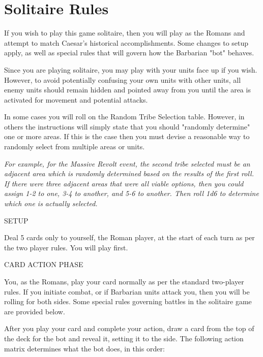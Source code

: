 \section{Solitaire Rules}

If you wish to play this game solitaire, then you will play as the Romans and attempt to match Caesar's historical accomplishments. Some changes to setup apply, as well as special rules that will govern how the Barbarian "bot" behaves.

Since you are playing solitaire, you may play with your units face up if you wish. However, to avoid potentially confusing your own units with other units, all enemy units should remain hidden and pointed away from you until the area is activated for movement and potential attacks.

In some cases you will roll on the Random Tribe Selection table. However, in others the instructions will simply state that you should "randomly determine" one or more areas. If this is the case then you must devise a reasonable way to randomly select from multiple areas or units.

\textit{For example, for the Massive Revolt event, the second tribe selected must be an adjacent area which is randomly determined based on the results of the first roll. If there were three adjacent areas that were all viable options, then you could assign 1-2 to one, 3-4 to another, and 5-6 to another. Then roll 1d6 to determine which one is actually selected.}

SETUP

Deal 5 cards only to yourself, the Roman player, at the start of each turn as per the two player rules. You will play first.

CARD ACTION PHASE

You, as the Romans, play your card normally as per the standard two-player rules. If you initiate combat, or if Barbarian units attack you, then you will be rolling for both sides. Some special rules governing battles in the solitaire game are provided below.

After you play your card and complete your action, draw a card from the top of the deck for the bot and reveal it, setting it to the side. The following action matrix determines what the bot does, in this order:

